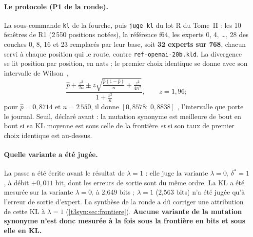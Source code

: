 \paragraph{Le protocole (P1 de la ronde).} La sous-commande \texttt{kl} de la fourche, puis \texttt{juge kl} du lot R du Tome~II : les 10 fenêtres de R1 (2\,550 positions notées), la référence f64, les experts 0, 4, \ldots, 28 des couches 0, 8, 16 et 23 remplacés par leur base, soit \textbf{32 experts sur 768}, chacun servi à chaque position qui le route, contre \texttt{ref-openai-20b.kld}. La divergence~\cite{kullback1951} se lit position par position, en nats ; le premier choix identique se donne avec son intervalle de Wilson~\cite{wilson1927},
\begin{equation}\label{t3ecl:eq:wilson}
\frac{\hat p + \frac{z^2}{2n} \pm z\sqrt{\frac{\hat p (1-\hat p)}{n} + \frac{z^2}{4n^2}}}{1 + \frac{z^2}{n}}, \qquad z = 1{,}96 ;
\end{equation}
pour $\hat p = 0{,}8714$ et $n = 2\,550$, il donne $[0{,}8578 ;\ 0{,}8838]$ \calc, l'intervalle que porte le journal. Seuil, déclaré avant : la mutation synonyme est meilleure de bout en bout si sa KL moyenne est sous celle de la frontière \emph{et} si son taux de premier choix identique est au-dessus.

\paragraph{Quelle variante a été jugée.} La passe a été écrite avant le résultat de $\lambda = 1$ : elle juge la variante $\lambda = 0$, $\delta^\ast = 1$, à débit $+0{,}011$ bit, dont les erreurs de sortie sont du même ordre. La KL a été mesurée sur la variante $\lambda = 0$, à 2,649 bits ; $\lambda = 1$ (2,563 bits) n'a été jugée qu'à l'erreur de sortie d'expert. La synthèse de la ronde a dû corriger une attribution de cette KL à $\lambda = 1$ (\cref{t3syn:sec:frontiere}). \textbf{Aucune variante de la mutation synonyme n'est donc mesurée à la fois sous la frontière en bits et sous elle en KL.}

